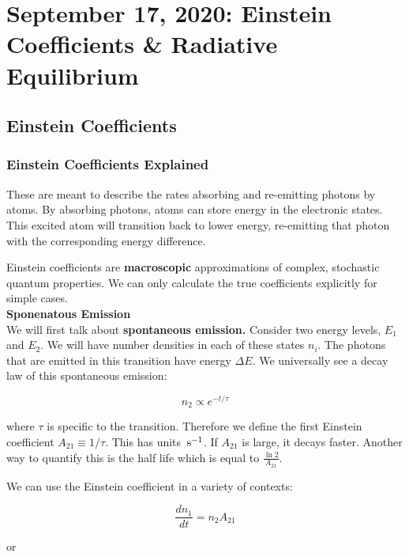 \documentclass{article}
\newcommand{\unit}[1]{{\,\rm #1}}
\newcommand{\s}{\unit{s}}
\begin{document}
\section{September 17, 2020: Einstein Coefficients \& Radiative Equilibrium}

\subsection{Einstein Coefficients}

\subsubsection{Einstein Coefficients Explained}

These are meant to describe the rates absorbing and re-emitting photons by atoms. By absorbing photons, atoms can store energy in the electronic states. This excited atom will transition back to lower energy, re-emitting that photon with the corresponding energy difference. 

Einstein coefficients are \textbf{macroscopic} approximations of complex, stochastic quantum properties. We can only calculate the true coefficients explicitly for simple cases. \\

\noindent\textbf{Sponenatous Emission}\\

We will first talk about \textbf{spontaneous emission.} Consider two energy levels, $E_1$ and $E_2$. We will have number densities in each of these states $n_i$. The photons that are emitted in this transition have energy $\Delta E$. We universally see a decay law of this spontaneous emission:

\begin{equation}
    n_2 \propto e^{-t/\tau}
\end{equation}

where $\tau$ is specific to the transition. Therefore we define the first Einstein coefficient $A_{21} \equiv 1/\tau$. This has units $\s^{-1}$. If $A_{21}$ is large, it decays faster. Another way to quantify this is the half life which is equal to $\frac{\ln 2}{A_{21}}$. 

We can use the Einstein coefficient in a variety of contexts:

\begin{equation}
    \frac{d n_1}{dt} = n_2 A_{21}
\end{equation}

or
\end{document}

